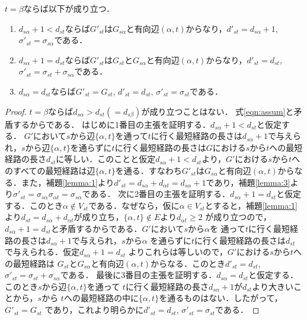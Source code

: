 \begin{lemma}
$t=\beta$ならば以下が成り立つ．
\begin{enumerate}
\item $d_{s\alpha}+1<d_{st}$ならば$G'_{st}$は$G_{s\alpha}$と有向辺$(\alpha,t)$からなり，$d'_{st}=d_{s\alpha}+1$, $\sigma'_{st}=\sigma_{s\alpha}$である．
\item $d_{s\alpha}+1=d_{st}$ならば$G'_{st}$は$G_{st}$と$G_{s\alpha}$と有向辺$(\alpha,t)$からなり，$d'_{st}=d_{st}$, $\sigma'_{st}=\sigma_{st}+\sigma_{s\alpha}$である．
\item $d_{s\alpha}=d_{st}$ならば$G'_{st}=G_{st}$, $d'_{st}=d_{st}$, $\sigma'_{st}=\sigma_{st}$である．
\end{enumerate}
\label{lemma:6}
\end{lemma}
\begin{proof}
$t=\beta$ならば$d_{s\alpha}>d_{st}(=d_{s\beta})$が成り立つことはない．
式\eqref{eqn:assum}と矛盾するからである．
はじめに1番目の主張を証明する．$d_{s\alpha}+1<d_{st}$と仮定する．
$G'$において$s$から辺$\{\alpha,t\}$を通って$t$に行く最短経路の長さは$d_{s\alpha}+1$で与えられ，$s$から辺$\{\alpha,t\}$を通らずに$t$に行く最短経路の長さは$G$における$s$から$t$への最短経路の長さ$d_{st}$に等しい．このことと仮定$d_{s\alpha}+1<d_{st}$より，$G'$における$s$から$t$へのすべての最短経路は辺$\{\alpha,t\}$を通る．すなわち$G'_{st}$は$G_{s\alpha}$と有向辺$(\alpha,t)$からなる．また，補題\ref{lemma:1}より$d'_{st}=d_{s\alpha}+d_{\alpha t}=d_{s\alpha}+1$であり，補題\ref{lemma:3}より$\sigma'_{st}=\sigma_{s\alpha}\sigma_{\alpha t}=\sigma_{s\alpha}$である．
%
次に2番目の主張を証明する．$d_{s\alpha}+1=d_{st}$と仮定する．このとき$\alpha \not\in V_{st}$である．なぜなら，仮に$\alpha \in V_{st}$とすると，補題\ref{lemma:1}より$d_{st}=d_{s\alpha}+d_{\alpha t}$が成り立ち，$\{\alpha,t\} \not\in E$より$d_{\alpha t} \geq 2$ が成り立つので，$d_{s\alpha}+1=d_{st}$と矛盾するからである．$G'$において$s$から$\alpha$を
通って$t$に行く最短経路の長さは$d_{s\alpha}+1$で与えられ，$s$から$\alpha$
を通らずに$t$に行く最短経路の長さは$d_{st}$で与えられる．仮定$d_{s\alpha}+1=d_{st}$
よりこれらは等しいので，$G'$における$s$から$t$への最短経路は
$G_{st}$と$G_{s\alpha}$と有向辺$(\alpha,t)$からなる．このとき$d'_{st}=d_{st}$, $\sigma'_{st}=\sigma_{st}+\sigma_{s\alpha}$である．
%
最後に3番目の主張を証明する．$d_{s\alpha}=d_{st}$と仮定する．
このとき$s$から辺$\{\alpha,t\}$を通って
$t$に行く最短経路の長さ$d_{s\alpha}+1$が$d_{st}$より大きいことから，$s$から
$t$への最短経路の中に$\{\alpha,t\}$を通るものはない．したがって，$G'_{st}=G_{st}$
であり，これより明らかに$d'_{st}=d_{st}$, $\sigma'_{st}=\sigma_{st}$である．
\end{proof}

